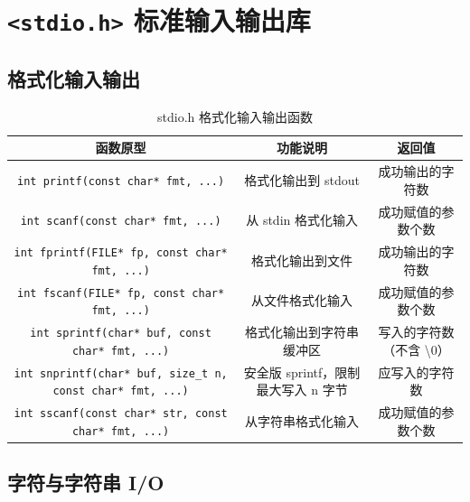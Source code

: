 \section{\texorpdfstring{\texttt{<stdio.h>} 标准输入输出库}{<stdio.h> 标准输入输出库}}

\subsection{格式化输入输出}

\begin{table}[H]
\centering
\renewcommand{\arraystretch}{1.6}
\begin{tabulary}{\linewidth}{CCC}
\toprule
\textbf{函数原型} & \textbf{功能说明} & \textbf{返回值} \\ \midrule
\texttt{int printf(const char* fmt, ...)} & 格式化输出到 stdout & 成功输出的字符数 \\ 
\texttt{int scanf(const char* fmt, ...)} & 从 stdin 格式化输入 & 成功赋值的参数个数 \\ 
\texttt{int fprintf(FILE* fp, const char* fmt, ...)} & 格式化输出到文件 & 成功输出的字符数 \\ 
\texttt{int fscanf(FILE* fp, const char* fmt, ...)} & 从文件格式化输入 & 成功赋值的参数个数 \\ 
\texttt{int sprintf(char* buf, const char* fmt, ...)} & 格式化输出到字符串缓冲区 & 写入的字符数（不含 \textbackslash 0） \\ 
\texttt{int snprintf(char* buf, size\_t n, const char* fmt, ...)} & 安全版 sprintf，限制最大写入 n 字节 & 应写入的字符数 \\ 
\texttt{int sscanf(const char* str, const char* fmt, ...)} & 从字符串格式化输入 & 成功赋值的参数个数 \\ \bottomrule
\end{tabulary}
\caption{stdio.h 格式化输入输出函数}
\label{tab:stdio_format}
\end{table}

\subsection{字符与字符串 I/O}

